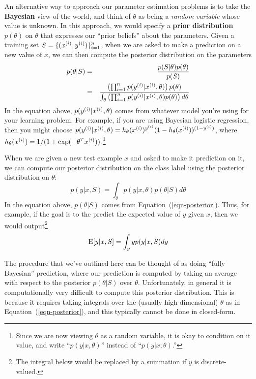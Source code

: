 \documentclass{article}
\begin{document}
An alternative way to approach our parameter estimation problems is 
to take the {\bf Bayesian}
view of the world, and think of $\theta$ as being a \emph{random variable} whose
value is unknown.
In this approach, we would specify a {\bf prior distribution} $p(\theta)$ on $\theta$
that expresses our ``prior beliefs'' about the parameters.  Given a training set 
$S = \{(x^{(i)}, y^{(i)})\}_{i=1}^{n}$, when we are asked to make a prediction on a 
new value of $x$, we can then compute the posterior distribution on the parameters
\begin{eqnarray}
p(\theta | S) &=& \frac{p(S|\theta) p(\theta)}{p(S)}  \nonumber \\
  &=& 
  \frac{\left(\prod_{i=1}^{n} p({y^{(i)}} | {x^{(i)}}, \theta)\right) p(\theta)}{\int_\theta \left(\prod_{i=1}^{n} p({y^{(i)}} | {x^{(i)}}, \theta) p(\theta) \right) d\theta} \label{eqn-posterior}
\end{eqnarray}
In the equation above, $p({y^{(i)}}|{x^{(i)}},\theta)$ comes from whatever model you're
using for your learning problem.  For example, if you are using Bayesian logistic
regression, then you might choose $p({y^{(i)}} | {x^{(i)}},\theta) = 
h_\theta({x^{(i)}})^{y^{(i)}}
(1-h_\theta({x^{(i)}}))^{(1-{y^{(i)}})}$, where 
$h_\theta({x^{(i)}}) = 1/(1+\exp(-\theta^T{x^{(i)}}))$.\footnote{Since we are 
now viewing $\theta$ as a random variable, it is okay to condition on
  it value, and write ``$p(y|x,\theta)$'' instead of ``$p(y|x;\theta)$.''}

When we are given a new test example $x$ and asked to make it prediction on it, 
we can compute our posterior distribution on the class label using the 
posterior distribution on $\theta$:
\begin{equation}
p(y|x, S) = \int_\theta p(y|x,\theta) p(\theta|S) d\theta  \label{eqn-avgy}
\end{equation}
In the equation above, $p(\theta|S)$ comes from Equation~(\ref{eqn-posterior}).  
Thus, for example, if the goal is to the predict the expected 
value of $y$ given $x$, then we would
output\footnote{The integral below would be replaced by a summation if $y$ is discrete-valued.}
\[
{\rm E}[y|x,S] = \int_y y p(y|x, S) dy
\]

The procedure that we've outlined here can be thought of as doing ``fully Bayesian'' 
prediction, where our prediction is computed by taking an average with respect
to the posterior $p(\theta|S)$ over $\theta$.
Unfortunately, in general it is computationally very difficult to compute this 
posterior distribution.  This is because it requires taking 
integrals over the (usually high-dimensional) $\theta$ as in Equation~(\ref{eqn-posterior}), 
and this typically cannot be done in closed-form.  
\end{document}
